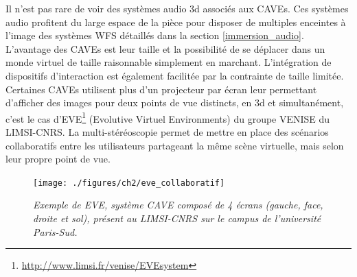 Il n'est pas rare de voir des systèmes audio 3d associés aux CAVEs. Ces systèmes audio profitent du large espace de la pièce pour disposer de multiples enceintes à l'image des systèmes WFS détaillés dans la section \ref{immersion_audio}.
L'avantage des CAVEs est leur taille et la possibilité de se déplacer dans un monde virtuel de taille raisonnable simplement en marchant. L'intégration de dispositifs d'interaction est également facilitée par la contrainte de taille limitée. 
Certaines CAVEs utilisent plus d'un projecteur par écran leur permettant d'afficher des images pour deux points de vue distincts, en 3d et simultanément, c'est le cas d'EVE\footnote{\url{http://www.limsi.fr/venise/EVEsystem}} (Evolutive Virtuel Environments) du groupe VENISE du LIMSI-CNRS. La multi-stéréoscopie permet de mettre en place des scénarios collaboratifs entre les utilisateurs partageant la même scène virtuelle, mais selon leur propre point de vue.

\begin{figure}
  \centering
  {\texttt{[image: ./figures/ch2/eve\_collaboratif]}}
    \caption{{\it Exemple de EVE, système CAVE composé de 4 écrans (gauche, face, droite et sol), présent au LIMSI-CNRS sur le campus de l'université Paris-Sud.}}
  \label{Fig:eve_collaboratif}
  \hspace{0.3cm}
\end{figure}

